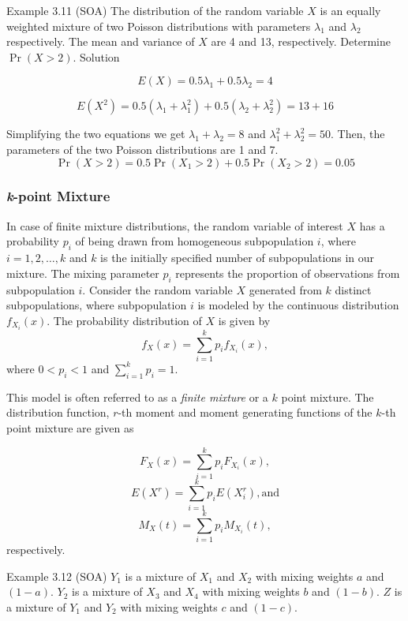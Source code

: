 \documentclass[]{book}
\begin{document}
Example 3.11 (SOA) The distribution of the random variable \(X\) is an
equally weighted mixture of two Poisson distributions with parameters
\(\lambda_{1}\) and \(\lambda_{2}\) respectively. The mean and variance
of \(X\) are 4 and 13, respectively. Determine
\(\Pr\left( X > 2 \right)\). Solution

\[E\left( X \right) = 0.5\lambda_{1} + 0.5\lambda_{2} = 4\]

\[E\left( X^{2} \right) = 0.5\left( \lambda_{1} + \lambda_{1}^{2} \right) + 0.5\left( \lambda_{2} + \lambda_{2}^{2} \right) = 13 + 16\]

Simplifying the two equations we get \(\lambda_{1} + \lambda_{2} = 8\)
and \(\lambda_{1}^{2} + \lambda_{2}^{2} = 50\). Then, the parameters of
the two Poisson distributions are 1 and 7.
\[\Pr\left( X > 2 \right) = 0.5\Pr\left( X_{1} > 2 \right) + 0.5\Pr\left( X_{2} > 2 \right) = 0.05\]

\subsubsection{\texorpdfstring{\emph{k}-point
Mixture}{k-point Mixture}}\label{k-point-mixture}

In case of finite mixture distributions, the random variable of interest
\(X\) has a probability \(p_{i}\) of being drawn from homogeneous
subpopulation \(i\), where \(i = 1,2,\ldots,k\) and \(k\) is the
initially specified number of subpopulations in our mixture. The mixing
parameter \(p_{i}\) represents the proportion of observations from
subpopulation \(i\). Consider the random variable \(X\) generated from
\(k\) distinct subpopulations, where subpopulation \(i\) is modeled by
the continuous distribution \(f_{X_{i}}\left( x \right)\). The
probability distribution of \(X\) is given by
\[f_{X}\left( x \right) = \sum_{i = 1}^{k}{p_{i}f_{X_{i}}\left( x \right)},\]
where \(0 < p_{i} < 1\) and \(\sum_{i = 1}^{k} p_{i} = 1\).

This model is often referred to as a \emph{finite mixture} or a \(k\)
point mixture. The distribution function, \(r\)-th moment and moment
generating functions of the \(k\)-th point mixture are given as

\[F_{X}\left( x \right) = \sum_{i = 1}^{k}{p_{i}F_{X_{i}}\left( x \right)},\]
\[E\left( X^{r} \right) = \sum_{i = 1}^{k}{p_{i}E\left( X_{i}^{r} \right)}, \text{and}\]
\[M_{X}\left( t \right) = \sum_{i = 1}^{k}{p_{i}M_{X_{i}}\left( t \right)},\]
respectively.

Example 3.12 (SOA) \(Y_{1}\) is a mixture of \(X_{1}\) and \(X_{2}\)
with mixing weights \(a\) and \((1 - a)\). \(Y_{2}\) is a mixture of
\(X_{3}\) and \(X_{4}\) with mixing weights \(b\) and \((1 - b)\). \(Z\)
is a mixture of \(Y_{1}\) and \(Y_{2}\) with mixing weights \(c\) and
\((1 - c)\).
\end{document}
